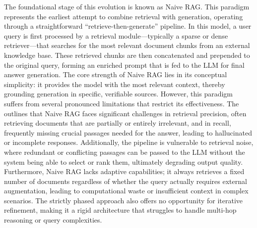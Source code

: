 \documentclass[11pt]{article}
\begin{document}
The foundational stage of this evolution is known as Naive RAG. This paradigm represents the earliest attempt to combine retrieval with generation, operating through a straightforward ``retrieve-then-generate'' pipeline. In this model, a user query is first processed by a retrieval module---typically a sparse or dense retriever---that searches for the most relevant document chunks from an external knowledge base. These retrieved chunks are then concatenated and prepended to the original query, forming an enriched prompt that is fed to the LLM for final answer generation. The core strength of Naive RAG lies in its conceptual simplicity: it provides the model with the most relevant context, thereby grounding generation in specific, verifiable sources. However, this paradigm suffers from several pronounced limitations that restrict its effectiveness. The \cite{ref2} outlines that Naive RAG faces significant challenges in retrieval precision, often retrieving documents that are partially or entirely irrelevant, and in recall, frequently missing crucial passages needed for the answer, leading to hallucinated or incomplete responses. Additionally, the pipeline is vulnerable to retrieval noise, where redundant or conflicting passages can be passed to the LLM without the system being able to select or rank them, ultimately degrading output quality. Furthermore, Naive RAG lacks adaptive capabilities; it always retrieves a fixed number of documents regardless of whether the query actually requires external augmentation, leading to computational waste or insufficient context in complex scenarios. The strictly phased approach also offers no opportunity for iterative refinement, making it a rigid architecture that struggles to handle multi-hop reasoning or query complexities.
\end{document}

